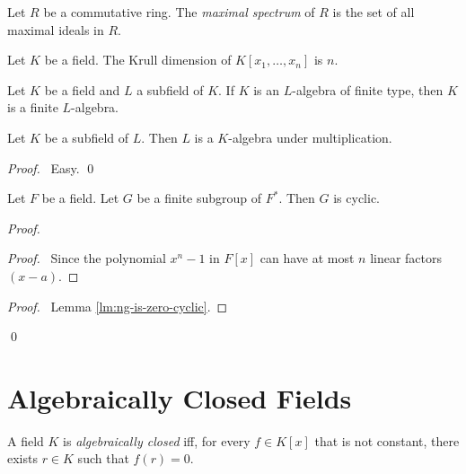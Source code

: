 \begin{df}
Let $R$ be a commutative ring. The \emph{maximal spectrum} of $R$ is the set of all maximal ideals in $R$.
\end{df}

\begin{prop}
Let $K$ be a field. The Krull dimension of $K[x_1, \ldots, x_n]$ is $n$.
\end{prop}


\begin{thm}
Let $K$ be a field and $L$ a subfield of $K$. If $K$ is an $L$-algebra of finite type, then $K$ is a finite $L$-algebra.
\end{thm}


\begin{prop}
Let $K$ be a subfield of $L$. Then $L$ is a $K$-algebra under multiplication.
\end{prop}

\begin{proof}
\pf\ Easy. \qed
\end{proof}

\begin{thm}
Let $F$ be a field. Let $G$ be a finite subgroup of $F^*$. Then $G$ is cyclic.
\end{thm}

\begin{proof}
\pf
{}
\begin{proof}
	\pf\ Since the polynomial $x^n - 1$ in $F[x]$ can have at most $n$ linear factors $(x - a)$.
\end{proof}
\qedstep
\begin{proof}
	\pf\ Lemma \ref{lm:ng-is-zero-cyclic}.
\end{proof}
\qed
\end{proof}

\chapter{Algebraically Closed Fields}

\begin{df}
A field $K$ is \emph{algebraically closed} iff, for every $f \in K[x]$ that is not constant, there exists $r \in K$ such that $f(r) = 0$.
\end{df}

